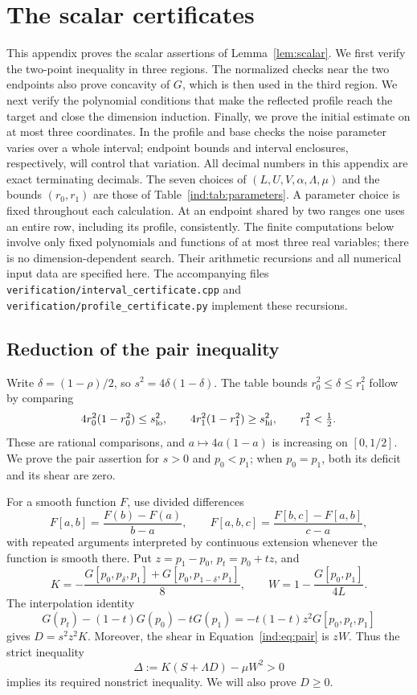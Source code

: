 \section{The scalar certificates}\label{app:scalar}

This appendix proves the scalar assertions of Lemma~\ref{lem:scalar}.
We first verify the two-point inequality in three regions.  The
normalized checks near the two endpoints also prove concavity of $G$,
which is then used in the third region.  We next verify the polynomial
conditions that make the reflected profile reach the target and close
the dimension induction.  Finally, we prove the initial estimate on at
most three coordinates.  In the profile and base checks the noise
parameter varies over a whole interval; endpoint bounds and interval
enclosures, respectively, will control that variation.
All decimal numbers in this appendix are exact terminating decimals.
The seven choices of $(L,U,V,\alpha,\Lambda,\mu)$ and the bounds
$(r_0,r_1)$ are those of Table~\ref{ind:tab:parameters}.  A parameter
choice is fixed throughout each calculation.  At an endpoint shared by
two ranges one uses an entire row, including its profile, consistently.
The finite computations below involve only fixed polynomials and functions
of at most three real variables; there is no dimension-dependent search.
Their arithmetic recursions and all numerical input data are specified
here.  The accompanying files
\texttt{verification/interval\_certificate.cpp} and
\texttt{verification/profile\_certificate.py} implement these recursions.

\subsection{Reduction of the pair inequality}\label{sc:pair-reduction}

Write $\delta=(1-\rho)/2$, so $s^2=4\delta(1-\delta)$.
The table bounds $r_0^2\leq\delta\leq r_1^2$ follow by comparing
\[
 4r_0^2(1-r_0^2)\leq s_{\rm lo}^2,
 \qquad 4r_1^2(1-r_1^2)\geq s_{\rm hi}^2,
 \qquad r_1^2<\tfrac12.
\]
These are rational comparisons, and $a\mapsto4a(1-a)$ is increasing on
$[0,1/2]$.  We prove the pair assertion for $s>0$ and $p_0<p_1$;
when $p_0=p_1$, both its deficit and its shear are zero.

For a smooth function $F$, use divided differences
\[
 F[a,b]=\frac{F(b)-F(a)}{b-a},\qquad
 F[a,b,c]=\frac{F[b,c]-F[a,b]}{c-a},
\]
with repeated arguments interpreted by continuous extension whenever
the function is smooth there.  Put $z=p_1-p_0$, $p_t=p_0+tz$, and
\begin{equation}\label{sc:KW}
 K=-\frac{G[p_0,p_\delta,p_1]+G[p_0,p_{1-\delta},p_1]}8,
 \qquad W=1-\frac{G[p_0,p_1]}{4L}.
\end{equation}
The interpolation identity
\[
 G(p_t)-(1-t)G(p_0)-tG(p_1)
   =-t(1-t)z^2G[p_0,p_t,p_1]
\]
gives $D=s^2z^2K$.  Moreover, the shear in
Equation~\eqref{ind:eq:pair} is $zW$.  Thus the strict inequality
\begin{equation}\label{sc:Delta}
 \Delta:=K(S+\Lambda D)-\mu W^2>0
\end{equation}
implies its required nonstrict inequality.  We will also prove $D\geq0$.


